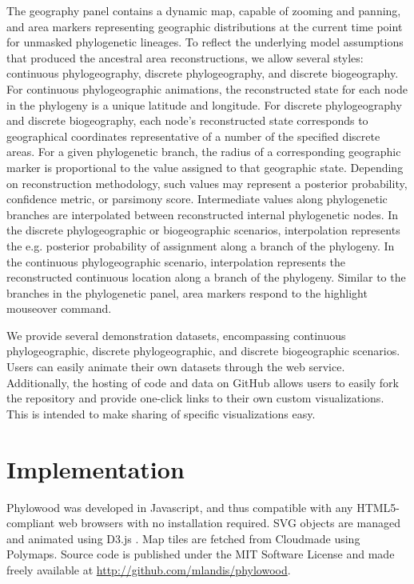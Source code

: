 \documentclass{bioinfo}
\begin{document}
The geography panel contains a dynamic map, capable of zooming and panning, and area markers representing geographic distributions at the current time point for unmasked phylogenetic lineages. To reflect the underlying model assumptions that produced the ancestral area reconstructions, we allow several styles: continuous phylogeography, discrete phylogeography, and discrete biogeography. For continuous phylogeographic animations, the reconstructed state for each node in the phylogeny is a unique latitude and longitude. For discrete phylogeography and discrete biogeography, each node's reconstructed state corresponds to geographical coordinates representative of a number of the specified discrete areas. For a given phylogenetic branch, the radius of a corresponding geographic marker is proportional to the value assigned to that geographic state. Depending on reconstruction methodology, such values may represent a posterior probability, confidence metric, or parsimony score. Intermediate values along phylogenetic branches are interpolated between reconstructed internal phylogenetic nodes. In the discrete phylogeographic or biogeographic scenarios, interpolation represents the e.g. posterior probability of assignment along a branch of the phylogeny. In the continuous phylogeographic scenario, interpolation represents the reconstructed continuous location along a branch of the phylogeny. Similar to the branches in the phylogenetic panel, area markers respond to the highlight mouseover command.

We provide several demonstration datasets, encompassing continuous phylogeographic, discrete phylogeographic, and discrete biogeographic scenarios. Users can easily animate their own datasets through the web service. Additionally, the hosting of code and data on GitHub allows users to easily fork the repository and provide one-click links to their own custom visualizations. This is intended to make sharing of specific visualizations easy.

\section{Implementation}

Phylowood was developed in Javascript, and thus compatible with any HTML5-compliant web browsers with no installation required. SVG objects are managed and animated using D3.js \citep{bostock11}. Map tiles are fetched from Cloudmade using Polymaps. Source code is published under the MIT Software License and made freely available at \href{http://github.com/mlandis/phylowood}{http://github.com/mlandis/phylowood}.
\end{document}
